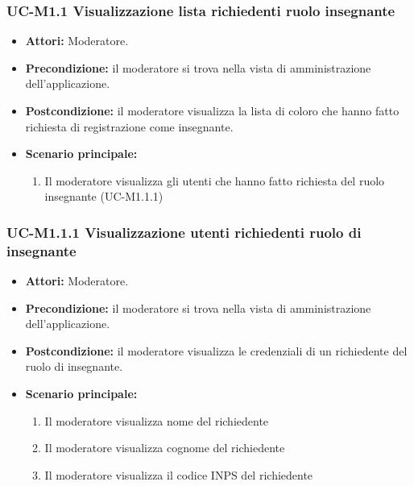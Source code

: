 \subsubsection{UC-M1.1 Visualizzazione lista richiedenti ruolo insegnante}
	\begin{itemize}
		\item \textbf{Attori:} Moderatore.
		\item \textbf{Precondizione:} il moderatore si trova nella vista di amministrazione dell'applicazione.
		\item \textbf{Postcondizione:} il moderatore visualizza la lista di coloro che hanno fatto richiesta di registrazione come insegnante.
		\item \textbf{Scenario principale:}
			\begin{enumerate}
				\item Il moderatore visualizza gli utenti che hanno fatto richiesta del ruolo insegnante (UC-M1.1.1)
			\end{enumerate}
	\end{itemize}
		
\subsubsection{UC-M1.1.1 Visualizzazione utenti richiedenti ruolo di insegnante}
	\begin{itemize}
		\item \textbf{Attori:} Moderatore.
		\item \textbf{Precondizione:} il moderatore si trova nella vista di amministrazione dell'applicazione.
		\item \textbf{Postcondizione:} il moderatore visualizza le credenziali di un richiedente del ruolo di insegnante.
		\item \textbf{Scenario principale:}
			\begin{enumerate}
				\item Il moderatore visualizza nome del richiedente
				\item Il moderatore visualizza cognome del richiedente
				\item Il moderatore visualizza il codice INPS del richiedente
			\end{enumerate}
	\end{itemize}			

